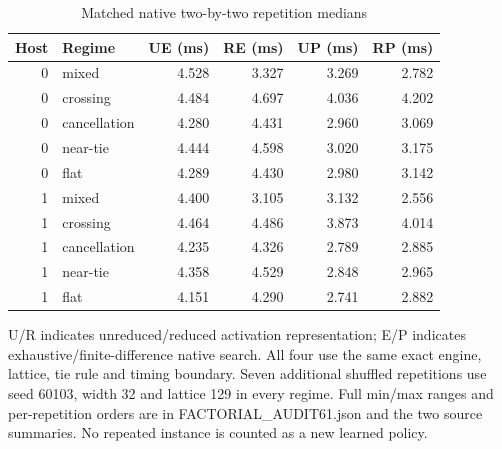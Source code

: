 \begin{table}[htbp]
\centering
\caption{Matched native two-by-two repetition medians}\label{tab:native-repeats61}
{\small\setlength{\tabcolsep}{3pt}
\begin{tabular}{rlrrrr}
\hline
Host & Regime & UE (ms) & RE (ms) & UP (ms) & RP (ms) \\
\hline
0 & mixed & 4.528 & 3.327 & 3.269 & 2.782 \\
0 & crossing & 4.484 & 4.697 & 4.036 & 4.202 \\
0 & cancellation & 4.280 & 4.431 & 2.960 & 3.069 \\
0 & near-tie & 4.444 & 4.598 & 3.020 & 3.175 \\
0 & flat & 4.289 & 4.430 & 2.980 & 3.142 \\
1 & mixed & 4.400 & 3.105 & 3.132 & 2.556 \\
1 & crossing & 4.464 & 4.486 & 3.873 & 4.014 \\
1 & cancellation & 4.235 & 4.326 & 2.789 & 2.885 \\
1 & near-tie & 4.358 & 4.529 & 2.848 & 2.965 \\
1 & flat & 4.151 & 4.290 & 2.741 & 2.882 \\
\hline\end{tabular}}
\par\smallskip
{\footnotesize U/R indicates unreduced/reduced activation representation; E/P indicates exhaustive/finite-difference native search. All four use the same exact engine, lattice, tie rule and timing boundary. Seven additional shuffled repetitions use seed 60103, width 32 and lattice 129 in every regime. Full min/max ranges and per-repetition orders are in FACTORIAL\_AUDIT61.json and the two source summaries. No repeated instance is counted as a new learned policy.}
\end{table}
